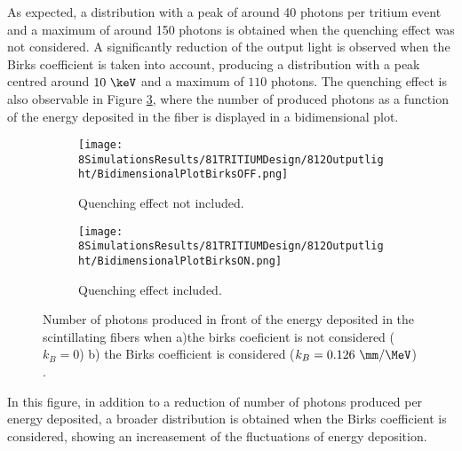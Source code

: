 As expected, a distribution with a peak of around 40 photons per tritium event and a maximum of around 150 photons is obtained when the quenching effect was not considered. A significantly reduction of the output light is observed when the Birks coefficient is taken into account, producing a distribution with a peak centred around $10~\keV$ and a maximum of $110$ photons. The quenching effect is also observable in Figure \ref{fig:2DimPlotBirks}, where the number of produced photons as a function of the energy deposited in the fiber is displayed in a bidimensional plot.

\begin{figure}
\centering
    \begin{subfigure}[b]{0.4\textwidth}
    \centering
    \texttt{[image: 8SimulationsResults/81TRITIUMDesign/812Outputlight/BidimensionalPlotBirksOFF.png]}  
    \caption{Quenching effect not included.\label{subfig:2DimPlotNoBirks}}
    \end{subfigure}
    \hfill
    \begin{subfigure}[b]{0.4\textwidth}
    \centering
    \texttt{[image: 8SimulationsResults/81TRITIUMDesign/812Outputlight/BidimensionalPlotBirksON.png]}  
    \caption{Quenching effect included.\label{subfig:2DimPlotBirks}}
    \end{subfigure}
 \caption{Number of photons produced in front of the energy deposited in the scintillating fibers when a)the birks coeficient is not considered ($k_B=0$) b) the Birks coefficient is considered ($k_B=0.126~\mm/\MeV$) \cite{SimulationPaperCarlos}.}
 \label{fig:2DimPlotBirks}
\end{figure}

In this figure, in addition to a reduction of number of photons produced per energy deposited, a broader distribution is obtained when the Birks coefficient is considered, showing an increasement of the fluctuations of energy deposition.